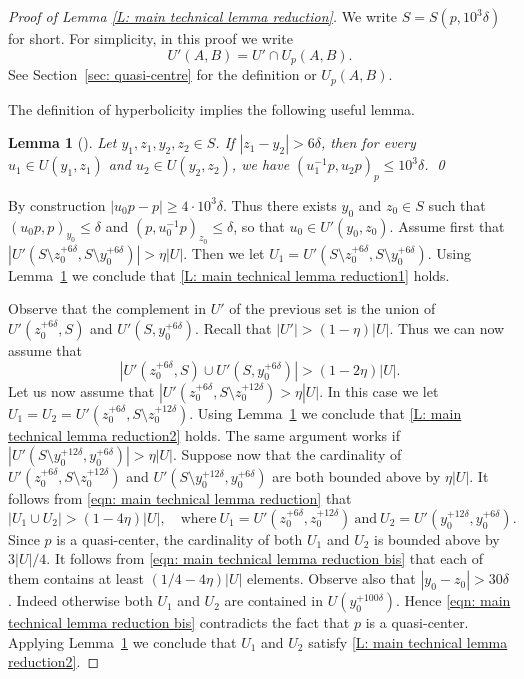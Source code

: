 \documentclass[11pt]{article}
\theoremstyle{plain}
\newtheorem{lem}[thm]{Lemma}
\theoremstyle{definition}
\begin{document}
\begin{proof}[Proof of Lemma \ref{L: main technical lemma reduction}]
We write $S=S(p,10^3 \delta)$ for short.
For simplicity, in this proof we write
\[
U'(A,B) = U' \cap U_p(A,B).
\]
See Section~\ref{sec: quasi-centre} for the definition or $U_p(A,B)$.

The definition of hyperbolicity implies the following useful lemma.

\begin{lem}[{\cite[Lem.\,6.1]{delzant_product_2020}}]
\label{L: reduction 1}
Let $y_1,z_1,y_2,z_2\in S$.
If $|z_1-y_2|>6\delta$, then for every $u_1 \in U(y_1, z_1)$ and $u_2 \in U(y_2,z_2)$, we have $ (u_1^{-1}p,u_2p)_p\leqslant 10^3 \delta$. \qed
\end{lem}

By construction $|u_0p - p| \geq 4\cdot 10^3\delta$.
Thus there exists $y_0$ and $z_0 \in S$ such that $(u_0p,p)_{y_0}\leqslant \delta$ and $(p,u_0^ {-1}p)_{z_0}\leq \delta$, so that $u_0 \in U'(y_0, z_0)$.
Assume first that \hbox{$|U'(S\setminus z_0^{+6\delta},S\setminus y_0^ {+6\delta})|>\eta|U|$}.
Then we let $U_1 = U'(S\setminus z_0^{+6\delta},S\setminus y_0^ {+6\delta})$.
Using Lemma~\ref{L: reduction 1} we conclude that \eqref{L: main technical lemma reduction1} holds.

Observe that the complement in $U'$ of the previous set is the union of $U'(z_0^{+6\delta}, S)$ and $U'(S,y_0^ {+6\delta})$.
Recall that $|U'| > (1 -\eta)|U|$.
Thus we can now assume that
\begin{equation}
\label{eqn: main technical lemma reduction}
\left| U'(z_0^{+6\delta}, S) \cup U'(S,y_0^ {+6\delta}) \right| > (1-2\eta)|U|.
\end{equation}
Let us now assume that $|U'(z_0^{+6\delta}, S\setminus z_0^{+12\delta}) > \eta |U|$.
In this case we let $U_1 = U_2 = U'(z_0^{+6\delta}, S\setminus z_0^{+12\delta})$.
Using Lemma~\ref{L: reduction 1} we conclude that \eqref{L: main technical lemma reduction2} holds.
The same argu\-ment works if $|U'(S\setminus y_0^ {+12\delta},y_0^ {+6\delta})| > \eta|U|$.
Suppose now that the cardinality of \hbox{$U'(z_0^{+6\delta}, S\setminus z_0^{+12\delta})$} and $U'(S\setminus y_0^ {+12\delta},y_0^ {+6\delta})$ are both bounded above by $\eta |U|$.
It follows from \eqref{eqn: main technical lemma reduction} that
\begin{equation}
\label{eqn: main technical lemma reduction bis}
\left| U_1 \cup U_2 \right| > (1-4\eta)|U|, \quad
\text{where}\ U_1 \!=\! U'(z_0^{+6\delta}, z_0^{+12\delta})\ \text{and}\ U_2 \!=\! U'(y_0^ {+12\delta},y_0^ {+6\delta}).
\end{equation}
Since $p$ is a quasi-center, the cardinality of both $U_1$ and $U_2$ is bounded above by $3|U|/4$.
It follows from \eqref{eqn: main technical lemma reduction bis} that each of them contains at least $(1/4 - 4\eta)|U|$ elements.
Observe also that $|y_0 - z_0| > 30\delta$.
Indeed otherwise both $U_1$ and $U_2$ are contained in $U(y_0^{+100\delta})$.
Hence \eqref{eqn: main technical lemma reduction bis} contradicts the fact that $p$ is a quasi-center.
Applying Lemma~\ref{L: reduction 1} we conclude that $U_1$ and $U_2$ satisfy \eqref{L: main technical lemma reduction2}.
\end{proof}
\end{document}
